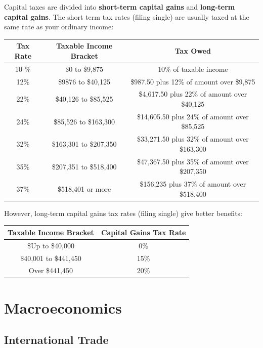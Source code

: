 \documentclass{article}
\begin{document}
  \begin{example}
    Capital taxes are divided into \textbf{short-term capital gains} and \textbf{long-term capital gains}. The short term tax rates (filing single) are usually taxed at the same rate as your ordinary income:
    \begin{center}
    \begin{tabular}{c|c|c}
        Tax Rate & Taxable Income Bracket & Tax Owed \\
        \hline
        10 \% & \$0 to \$9,875 & 10\% of taxable income \\
        12\% & \$9876 to \$40,125 & \$987.50 plus 12\% of amount over \$9,875\\
        22\% & \$40,126 to \$85,525 & \$4,617.50 plus 22\% of amount over \$40,125\\
        24\% & \$85,526 to \$163,300 & \$14,605.50 plus 24\% of amount over \$85,525\\
        32\% & \$163,301 to \$207,350 & \$33,271.50 plus 32\% of amount over \$163,300\\
        35\% & \$207,351 to \$518,400 & \$47,367.50 plus 35\% of amount over \$207,350\\
        37\% & \$518,401 or more & \$156,235 plus 37\% of amount over \$518,400
    \end{tabular}
    \end{center}
    However, long-term capital gains tax rates (filing single) give better benefits: 
    \begin{center}
    \begin{tabular}{c|c}
        Taxable Income Bracket & Capital Gains Tax Rate\\
        \hline
        \$Up to \$40,000 & 0\% \\
        \$40,001 to \$441,450 & 15\% \\
        Over \$441,450 & 20\% 
    \end{tabular}
    \end{center}
  \end{example}

\section{Macroeconomics}

  \subsection{International Trade}
\end{document}
